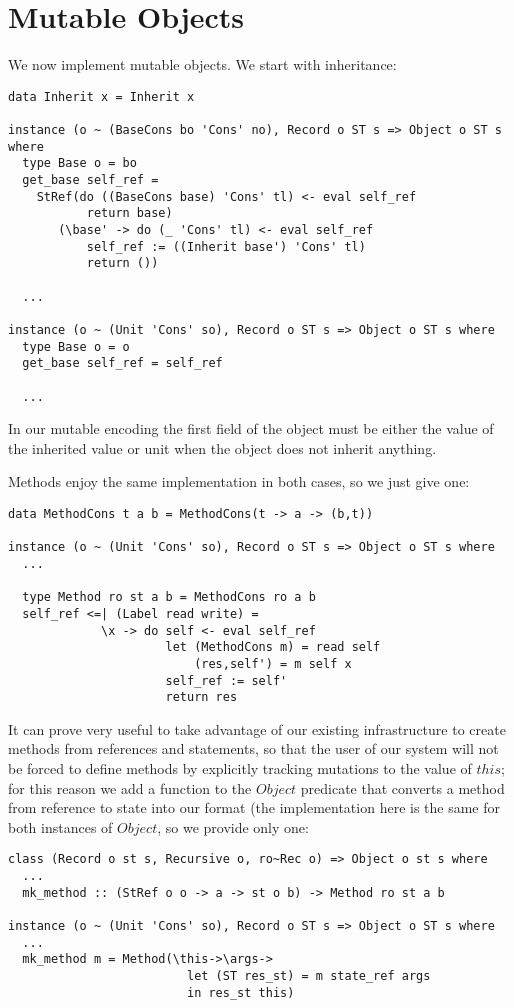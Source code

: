 \section{Mutable Objects}
We now implement mutable objects. We start with inheritance:
\begin{lstlisting}
data Inherit x = Inherit x

instance (o ~ (BaseCons bo 'Cons' no), Record o ST s => Object o ST s where
  type Base o = bo
  get_base self_ref =
	StRef(do ((BaseCons base) 'Cons' tl) <- eval self_ref
           return base)
       (\base' -> do (_ 'Cons' tl) <- eval self_ref
           self_ref := ((Inherit base') 'Cons' tl)
           return ())

  ...

instance (o ~ (Unit 'Cons' so), Record o ST s => Object o ST s where
  type Base o = o
  get_base self_ref = self_ref

  ...
\end{lstlisting}
In our mutable encoding the first field of the object must be either the value of the inherited value or unit when the object does not inherit anything.

Methods enjoy the same implementation in both cases, so we just give one:
\begin{lstlisting}
data MethodCons t a b = MethodCons(t -> a -> (b,t))

instance (o ~ (Unit 'Cons' so), Record o ST s => Object o ST s where
  ...

  type Method ro st a b = MethodCons ro a b
  self_ref <=| (Label read write) = 
             \x -> do self <- eval self_ref
                      let (MethodCons m) = read self
                          (res,self') = m self x
                      self_ref := self'
                      return res
\end{lstlisting}

It can prove very useful to take advantage of our existing infrastructure to create methods from references and statements, so that the user of our system will not be forced to define methods by explicitly tracking mutations to the value of $this$; for this reason we add a function to the $Object$ predicate that converts a method from reference to state into our format (the implementation here is the same for both instances of $Object$, so we provide only one:
\begin{lstlisting}
class (Record o st s, Recursive o, ro~Rec o) => Object o st s where
  ...
  mk_method :: (StRef o o -> a -> st o b) -> Method ro st a b

instance (o ~ (Unit 'Cons' so), Record o ST s => Object o ST s where
  ...
  mk_method m = Method(\this->\args->
                         let (ST res_st) = m state_ref args
                         in res_st this)
\end{lstlisting}